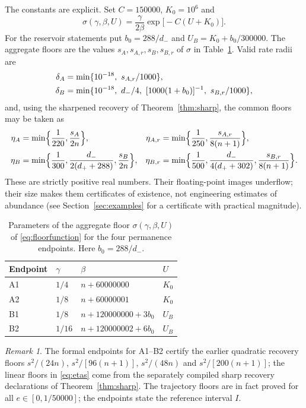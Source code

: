 \documentclass[11pt,a4paper]{article}
\theoremstyle{plain}
\theoremstyle{definition}
\theoremstyle{remark}
\newtheorem{remark}[theorem]{Remark}
\begin{document}
The constants are explicit. Set $C=150000$, $K_0=10^6$ and
\begin{equation}\label{eq:floorfunction}
\sigma(\gamma,\beta,U)=\frac{\gamma}{2\beta}\exp\bigl[-C(U+K_0)\bigr].
\end{equation}
For the reservoir statements put $b_0=288/d_-$ and $U_B=K_0+b_0/300000$. The aggregate floors are the values $s_A,s_{A,r},s_B,s_{B,r}$ of $\sigma$ in Table~\ref{tab:constants}. Valid rate radii are
\begin{align}
\delta_A&=\min\{10^{-18},\ s_{A,r}/1000\},\label{eq:radii}\\
\delta_B&=\min\{10^{-18},\ d_-/4,\ [1000(1+b_0)]^{-1},\ s_{B,r}/1000\},\notag
\end{align}
and, using the sharpened recovery of Theorem~\ref{thm:sharp}, the common floors may be taken as
\begin{align}
\eta_A&=\min\Bigl\{\frac1{220},\frac{s_A}{2n}\Bigr\},&
\eta_{A,r}&=\min\Bigl\{\frac1{250},\frac{s_{A,r}}{8(n+1)}\Bigr\},\notag\\
\eta_B&=\min\Bigl\{\frac1{300},\frac{d_-}{2(d_++288)},\frac{s_B}{2n}\Bigr\},&
\eta_{B,r}&=\min\Bigl\{\frac1{500},\frac{d_-}{4(d_++302)},\frac{s_{B,r}}{8(n+1)}\Bigr\}.\label{eq:etas}
\end{align}
These are strictly positive real numbers. Their floating-point images underflow; their size makes them certificates of existence, not engineering estimates of abundance (see Section~\ref{sec:examples} for a certificate with practical magnitude).

\begin{table}[htbp]
\centering
\caption{Parameters of the aggregate floor $\sigma(\gamma,\beta,U)$ of \eqref{eq:floorfunction} for the four permanence endpoints. Here $b_0=288/d_-$.}
\label{tab:constants}
\begin{tabular}{llll}
\toprule
Endpoint&$\gamma$&$\beta$&$U$\\\midrule
A1&$1/4$&$n+60000000$&$K_0$\\
A2&$1/8$&$n+60000001$&$K_0$\\
B1&$1/8$&$n+120000000+3b_0$&$U_B$\\
B2&$1/16$&$n+120000002+6b_0$&$U_B$\\\bottomrule
\end{tabular}
\end{table}

\begin{remark}
The formal endpoints for A1--B2 certify the earlier quadratic recovery floors $s^2/(24n)$, $s^2/[96(n+1)]$, $s^2/(48n)$ and $s^2/[200(n+1)]$; the linear floors in \eqref{eq:etas} come from the separately compiled sharp recovery declarations of Theorem~\ref{thm:sharp}. The trajectory floors are in fact proved for all $e\in[0,1/50000]$; the endpoints state the reference interval $I$.
\end{remark}
\end{document}
